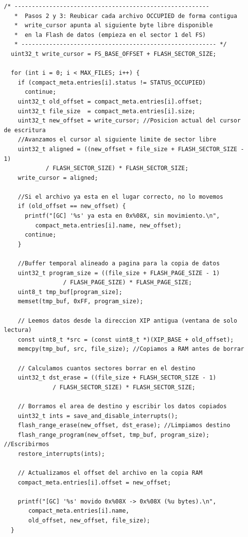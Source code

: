 \documentclass[12pt,letterpaper]{article}
\begin{document}
\begin{lstlisting}[style=modernc, caption={Implementación de \texttt{fs\_compact}: ordenamiento y relocalización}]
  /* --------------------------------------------------------
   *  Pasos 2 y 3: Reubicar cada archivo OCCUPIED de forma contigua
   *  write_cursor apunta al siguiente byte libre disponible
   *  en la Flash de datos (empieza en el sector 1 del FS)
   * -------------------------------------------------------- */
  uint32_t write_cursor = FS_BASE_OFFSET + FLASH_SECTOR_SIZE;
  
  for (int i = 0; i < MAX_FILES; i++) {
    if (compact_meta.entries[i].status != STATUS_OCCUPIED)
      continue;
    uint32_t old_offset = compact_meta.entries[i].offset;
    uint32_t file_size  = compact_meta.entries[i].size;
    uint32_t new_offset = write_cursor; //Posicion actual del cursor de escritura
    //Avanzamos el cursor al siguiente limite de sector libre
    uint32_t aligned = ((new_offset + file_size + FLASH_SECTOR_SIZE - 1)
			/ FLASH_SECTOR_SIZE) * FLASH_SECTOR_SIZE;
    write_cursor = aligned;
    
    //Si el archivo ya esta en el lugar correcto, no lo movemos
    if (old_offset == new_offset) {
      printf("[GC] '%s' ya esta en 0x%08X, sin movimiento.\n",
	     compact_meta.entries[i].name, new_offset);
      continue;
    }
    
    //Buffer temporal alineado a pagina para la copia de datos
    uint32_t program_size = ((file_size + FLASH_PAGE_SIZE - 1)
			     / FLASH_PAGE_SIZE) * FLASH_PAGE_SIZE;
    uint8_t tmp_buf[program_size];
    memset(tmp_buf, 0xFF, program_size);
    
    // Leemos datos desde la direccion XIP antigua (ventana de solo lectura)
    const uint8_t *src = (const uint8_t *)(XIP_BASE + old_offset);
    memcpy(tmp_buf, src, file_size); //Copiamos a RAM antes de borrar
    
    // Calculamos cuantos sectores borrar en el destino 
    uint32_t dst_erase = ((file_size + FLASH_SECTOR_SIZE - 1)
			  / FLASH_SECTOR_SIZE) * FLASH_SECTOR_SIZE;
    
    // Borramos el area de destino y escribir los datos copiados
    uint32_t ints = save_and_disable_interrupts();
    flash_range_erase(new_offset, dst_erase); //Limpiamos destino
    flash_range_program(new_offset, tmp_buf, program_size); //Escribirmos
    restore_interrupts(ints);
    
    // Actualizamos el offset del archivo en la copia RAM
    compact_meta.entries[i].offset = new_offset;
    
    printf("[GC] '%s' movido 0x%08X -> 0x%08X (%u bytes).\n",
	   compact_meta.entries[i].name,
	   old_offset, new_offset, file_size);
  }
  

\end{lstlisting}
\end{document}
